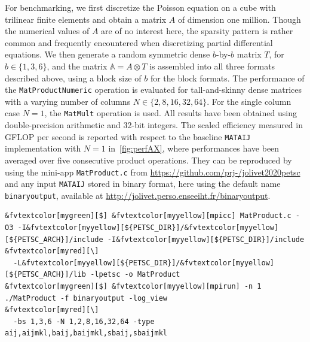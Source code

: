 \documentclass[3p,11pt]{elsarticle}
\newcommand{\pk}[1]{\texttt{#1}}
\begin{document}
For benchmarking, we first discretize the Poisson equation on a cube with trilinear finite elements
and obtain a matrix $A$ of dimension one million. Though the numerical
values of $A$ are of no interest here, the sparsity pattern is rather common and frequently encountered when
discretizing partial differential equations. We then generate a random symmetric dense $b$-by-$b$ matrix $T$,
for $b \in \{ 1,3,6 \}$, and the matrix $\mathbb{A} = A \otimes T$ is assembled into all three formats described above, using
a block size of $b$ for the block formats.
The performance of the \pk{MatProductNumeric} operation is evaluated for tall-and-skinny dense matrices with a varying number
of columns $N \in \{2,8,16,32,64\}$. For the single column case $N=1$, the \pk{MatMult} operation is used.
All results have been obtained using double-precision arithmetic and 32-bit integers. The scaled efficiency measured in GFLOP per second is reported
with respect to the baseline \pk{MATAIJ} implementation with $N=1$ in~\cref{fig:perfAX}, where performances have been averaged over five consecutive
product operations.
They can be reproduced by using the mini-app \texttt{MatProduct.c} from \url{https://github.com/prj-/jolivet2020petsc} and any input \pk{MATAIJ} stored in binary format,
here using the default name \pk{binaryoutput}, available at \url{http://jolivet.perso.enseeiht.fr/binaryoutput}.
\begin{Verbatim}[fontsize=\footnotesize,frame=single,framerule=0.1mm,commandchars=&\[\]]
&fvtextcolor[mygreen][$] &fvtextcolor[myyellow][mpicc] MatProduct.c -O3 -I&fvtextcolor[myyellow][${PETSC_DIR}]/&fvtextcolor[myyellow][${PETSC_ARCH}]/include -I&fvtextcolor[myyellow][${PETSC_DIR}]/include             &fvtextcolor[myred][\]
  -L&fvtextcolor[myyellow][${PETSC_DIR}]/&fvtextcolor[myyellow][${PETSC_ARCH}]/lib -lpetsc -o MatProduct
&fvtextcolor[mygreen][$] &fvtextcolor[myyellow][mpirun] -n 1 ./MatProduct -f binaryoutput -log_view                                             &fvtextcolor[myred][\]
  -bs 1,3,6 -N 1,2,8,16,32,64 -type aij,aijmkl,baij,baijmkl,sbaij,sbaijmkl
\end{Verbatim}
\end{document}
